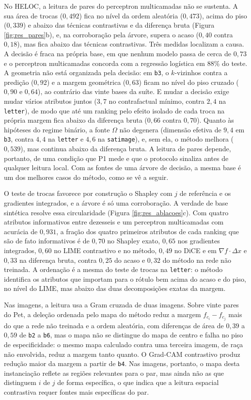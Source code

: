 No HELOC, a leitura de pares do perceptron multicamadas não se sustenta. A sua área de trocas ($0{,}492$) fica no nível da ordem aleatória ($0{,}473$), acima do piso ($0{,}339$) e abaixo das técnicas contrastivas e da diferença bruta (Figura \ref{fig:res_pares}b), e, na corroboração pela árvore, supera o acaso ($0{,}40$ contra $0{,}18$), mas fica abaixo das técnicas contrastivas. Três medidas localizam a causa. A decisão é fraca na própria base, em que nenhum modelo passa de cerca de $0{,}73$ e o perceptron multicamadas concorda com a regressão logística em 88\% do teste. A geometria não está organizada pela decisão: em \texttt{b3}, o $k$-vizinhos contra a predição ($0{,}92$) e a margem geométrica ($0{,}63$) ficam no nível do piso cruzado ($0{,}90$ e $0{,}64$), ao contrário das vinte bases da suíte. E mudar a decisão exige mudar vários atributos juntos ($3{,}7$ no contrafactual mínimo, contra $2{,}4$ na \texttt{letter}), de modo que até um ranking pelo efeito isolado de cada troca na própria margem fica abaixo da diferença bruta ($0{,}66$ contra $0{,}70$). Quanto às hipóteses do regime binário, a fonte $\Omega$ não degenera (dimensão efetiva de $9{,}4$ em \texttt{b3}, contra $4{,}4$ na \texttt{letter} e $4{,}6$ na \texttt{satimage}), e, sem ela, o método melhora ($0{,}539$), mas continua abaixo da diferença bruta. A leitura de pares depende, portanto, de uma condição que P1 mede e que o protocolo sinaliza antes de qualquer leitura local. Com as fontes de uma árvore de decisão, a mesma base é um dos melhores casos do método, como se vê a seguir.

O teste de trocas favorece por construção o Shapley com $j$ de referência e os gradientes integrados, e a árvore é só uma corroboração. A verdade de base sintética resolve essa circularidade (Figura \ref{fig:res_ablacoes}c). Com quatro atributos informativos entre dezesseis e um perceptron multicamadas com acurácia de $0{,}931$, a fração dos quatro primeiros atributos de cada ranking que são de fato informativos é de $0{,}70$ no Shapley exato, $0{,}65$ nos gradientes integrados, $0{,}60$ no LIME contrastivo e no método, $0{,}49$ no DiCE e em $\nabla f\cdot\Delta x$ e $0{,}33$ na diferença bruta, contra $0{,}25$ do acaso e $0{,}32$ do método na rede não treinada. A ordenação é a mesma do teste de trocas na \texttt{letter}: o método identifica os atributos que importam para o rótulo bem acima do acaso e do piso, no nível do LIME, mas abaixo das duas decomposições exatas da margem.

Nas imagens, a leitura usa a Gram cruzada de duas imagens. Sobre vinte pares do Pet, a deleção ordenada pelo mapa do método reduz a margem $f_{c_i} - f_{c_j}$ mais do que a rede não treinada e a ordem aleatória, com diferenças de área de $0{,}39$ a $0{,}59$ de \texttt{b2} a \texttt{b6}, mas o mapa não se distingue do mapa de centro e falha no piso de especificidade: o mesmo mapa calculado contra uma terceira imagem, de raça não envolvida, reduz a margem tanto quanto. O Grad-CAM contrastivo produz redução maior da margem a partir de \texttt{b4}. Nas imagens, portanto, o mapa desta instanciação reflete as regiões relevantes para o par, mas ainda não as que distinguem $i$ de $j$ de forma específica, o que indica que a leitura espacial contrastiva requer fontes mais específicas do par.

